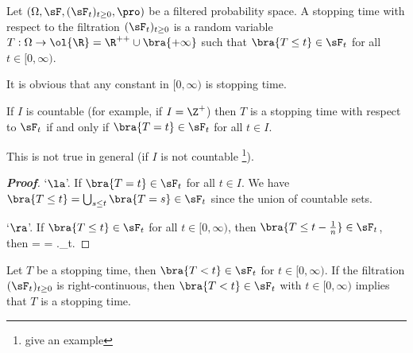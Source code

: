 \begin{definition}\label{def:stopping_time_continuous}
Let $(\Omega,\sF, (\sF_t)_{t\geq 0},\pro)$ be a filtered probability space. A stopping time with respect to the filtration $(\sF_t)_{t\geq 0}$ is a random variable $T:\Omega \to \ol{\R} = \R^{++}\cup \bra{+\infty}$ such that $\bra{T \leq t} \in \sF_t$ for all $t\in [0,\infty)$.
\end{definition}


\begin{remark}
It is obvious that any constant in $[0,\infty)$ is stopping time.
\end{remark}


\begin{proposition}
If $I$ is countable (for example, if $I = \Z^+$) then $T$ is a stopping time with respect to $\sF_t$ if and only if $\bra{T = t}\in \sF_t$ for all $t \in I$.
\end{proposition}

\begin{remark}
This is not true in general (if $I$ is not countable \footnote{give an example}).
\end{remark}

\begin{proof}[\bf Proof]
`$\la$'. If $\bra{T=t}\in \sF_t$ for all $t\in I$. We have $\bra{T\leq t} = \bigcup_{s\leq t} \bra{T=s} \in \sF_t$ since the union of countable sets.

`$\ra$'. If $\bra{T\leq t}\in \sF_t$ for all $t\in [0,\infty)$, then $\bra{T\leq t-\frac 1n} \in \sF_t$, then
\be
{} = \bs {} =  \left\bs {} \right.\in \sF_t.
\ee
\end{proof}

\begin{proposition}\label{pro:stopping_time_strictly_smaller_than_t_measurable}
Let $T$ be a stopping time, then $\bra{T<t} \in \sF_t$ for $t\in [0,\infty)$. If the filtration $(\sF_t)_{t\geq 0}$ is right-continuous, then $\bra{T<t}\in \sF_t$ with $t\in [0,\infty)$ implies that $T$ is a stopping time.
\end{proposition}

